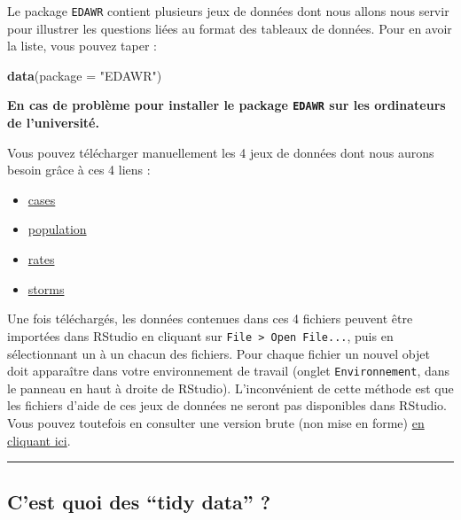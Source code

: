 \documentclass[
  a4paper,
]{article}
\newenvironment{Shaded}{\begin{snugshade}}{\end{snugshade}}
\newcommand{\DataTypeTok}[1]{\textcolor[rgb]{0.00,0.34,0.68}{#1}}
\newcommand{\KeywordTok}[1]{\textcolor[rgb]{0.12,0.11,0.11}{\textbf{#1}}}
\newcommand{\NormalTok}[1]{\textcolor[rgb]{0.12,0.11,0.11}{#1}}
\newcommand{\StringTok}[1]{\textcolor[rgb]{0.75,0.01,0.01}{#1}}
\providecommand{\tightlist}{%
  \setlength{\itemsep}{0pt}\setlength{\parskip}{0pt}}
\begin{document}
Le package \texttt{EDAWR} contient plusieurs jeux de données dont nous allons nous servir pour illustrer les questions liées au format des tableaux de données. Pour en avoir la liste, vous pouvez taper :

\begin{Shaded}
\begin{Highlighting}[]
\KeywordTok{data}\NormalTok{(}\DataTypeTok{package =} \StringTok{"EDAWR"}\NormalTok{)}
\end{Highlighting}
\end{Shaded}

\textbf{En cas de problème pour installer le package \texttt{EDAWR} sur les ordinateurs de l'université.}

Vous pouvez télécharger manuellement les 4 jeux de données dont nous aurons besoin grâce à ces 4 liens :

\begin{itemize}
\tightlist
\item
  \href{https://besibo.github.io/DA/data/cases.rdata}{cases}
\item
  \href{https://besibo.github.io/DA/data/population.rdata}{population}
\item
  \href{https://besibo.github.io/DA/data/rates.rdata}{rates}
\item
  \href{https://besibo.github.io/DA/data/storms.rdata}{storms}
\end{itemize}

Une fois téléchargés, les données contenues dans ces 4 fichiers peuvent être importées dans RStudio en cliquant sur \texttt{File\ \textgreater{}\ Open\ File...}, puis en sélectionnant un à un chacun des fichiers. Pour chaque fichier un nouvel objet doit apparaître dans votre environnement de travail (onglet \texttt{Environnement}, dans le panneau en haut à droite de RStudio). L'inconvénient de cette méthode est que les fichiers d'aide de ces jeux de données ne seront pas disponibles dans RStudio. Vous pouvez toutefois en consulter une version brute (non mise en forme) \href{https://github.com/rstudio/EDAWR/tree/master/man}{en cliquant ici}.

\begin{center}\rule{0.5\linewidth}{0.5pt}\end{center}

\hypertarget{cest-quoi-des-tidy-data}{%
\subsection{C'est quoi des ``tidy data'' ?}\label{cest-quoi-des-tidy-data}}
\end{document}
